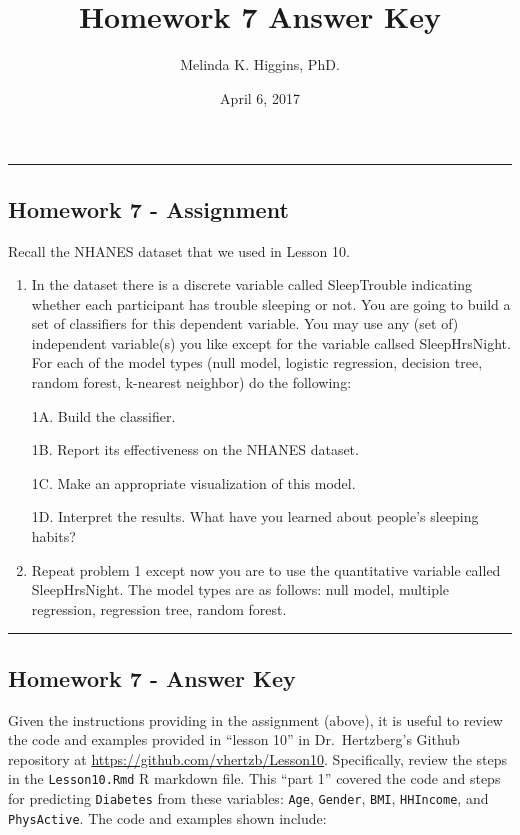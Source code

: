 \documentclass[]{article}
\title{Homework 7 Answer Key}
\author{Melinda K. Higgins, PhD.}
\date{April 6, 2017}
\begin{document}
\maketitle

\begin{center}\rule{0.5\linewidth}{\linethickness}\end{center}

\subsection{Homework 7 - Assignment}\label{homework-7---assignment}

Recall the NHANES dataset that we used in Lesson 10.

\begin{enumerate}
\def\labelenumi{\arabic{enumi}.}
\item
  In the dataset there is a discrete variable called SleepTrouble
  indicating whether each participant has trouble sleeping or not. You
  are going to build a set of classifiers for this dependent variable.
  You may use any (set of) independent variable(s) you like except for
  the variable callsed SleepHrsNight. For each of the model types (null
  model, logistic regression, decision tree, random forest, k-nearest
  neighbor) do the following:

  1A. Build the classifier.

  1B. Report its effectiveness on the NHANES dataset.

  1C. Make an appropriate visualization of this model.

  1D. Interpret the results. What have you learned about people's
  sleeping habits?
\item
  Repeat problem 1 except now you are to use the quantitative variable
  called SleepHrsNight. The model types are as follows: null model,
  multiple regression, regression tree, random forest.
\end{enumerate}

\begin{center}\rule{0.5\linewidth}{\linethickness}\end{center}

\subsection{Homework 7 - Answer Key}\label{homework-7---answer-key}

Given the instructions providing in the assignment (above), it is useful
to review the code and examples provided in ``lesson 10'' in
Dr.~Hertzberg's Github repository at
\url{https://github.com/vhertzb/Lesson10}. Specifically, review the
steps in the \texttt{Lesson10.Rmd} R markdown file. This ``part 1''
covered the code and steps for predicting \texttt{Diabetes} from these
variables: \texttt{Age}, \texttt{Gender}, \texttt{BMI},
\texttt{HHIncome}, and \texttt{PhysActive}. The code and examples shown
include:
\end{document}
